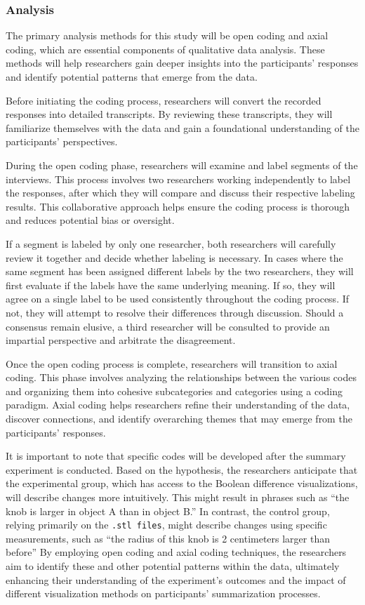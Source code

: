 \documentclass[sigconf,authorversion,nonacm]{acmart}
\begin{document}
\subsubsection{Analysis}
The primary analysis methods for this study will be open coding and axial coding, which are essential components of qualitative data analysis. These methods will help researchers gain deeper insights into the participants' responses and identify potential patterns that emerge from the data.

Before initiating the coding process, researchers will convert the recorded responses into detailed transcripts. By reviewing these transcripts, they will familiarize themselves with the data and gain a foundational understanding of the participants' perspectives.

During the open coding phase, researchers will examine and label segments of the interviews. This process involves two researchers working independently to label the responses, after which they will compare and discuss their respective labeling results. This collaborative approach helps ensure the coding process is thorough and reduces potential bias or oversight.

If a segment is labeled by only one researcher, both researchers will carefully review it together and decide whether labeling is necessary. In cases where the same segment has been assigned different labels by the two researchers, they will first evaluate if the labels have the same underlying meaning. If so, they will agree on a single label to be used consistently throughout the coding process. If not, they will attempt to resolve their differences through discussion. Should a consensus remain elusive, a third researcher will be consulted to provide an impartial perspective and arbitrate the disagreement.

Once the open coding process is complete, researchers will transition to axial coding. This phase involves analyzing the relationships between the various codes and organizing them into cohesive subcategories and categories using a coding paradigm. Axial coding helps researchers refine their understanding of the data, discover connections, and identify overarching themes that may emerge from the participants' responses.

It is important to note that specific codes will be developed after the summary experiment is conducted. Based on the hypothesis, the researchers anticipate that the experimental group, which has access to the Boolean difference visualizations, will describe changes more intuitively. This might result in phrases such as ``the knob is larger in object A than in object B.'' In contrast, the control group, relying primarily on the \texttt{.stl files}, might describe changes using specific measurements, such as ``the radius of this knob is 2 centimeters larger than before'' By employing open coding and axial coding techniques, the researchers aim to identify these and other potential patterns within the data, ultimately enhancing their understanding of the experiment's outcomes and the impact of different visualization methods on participants' summarization processes.
\end{document}
